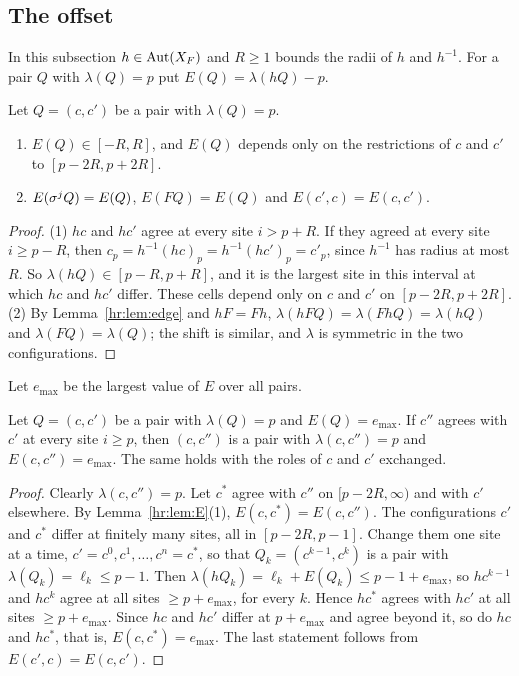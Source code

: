 \subsection{The offset}\label{hr:sec:offset}

In this subsection $h\in\operatorname{Aut}(X_F)$ and $R\ge1$ bounds the radii of $h$ and $h^{-1}$. For a pair $Q$ with $\lambda(Q)=p$ put $E(Q)=\lambda(hQ)-p$.

\begin{lemma}\label{hr:lem:E}
Let $Q=(c,c')$ be a pair with $\lambda(Q)=p$.
\begin{enumerate}
\item $E(Q)\in[-R,R]$, and $E(Q)$ depends only on the restrictions of $c$ and $c'$ to $[p-2R,p+2R]$.
\item $E(\sigma^jQ)=E(Q)$, $E(FQ)=E(Q)$ and $E(c',c)=E(c,c')$.
\end{enumerate}
\end{lemma}

\begin{proof}
(1) $hc$ and $hc'$ agree at every site $i>p+R$. If they agreed at every site $i\ge p-R$, then $c_p=h^{-1}(hc)_p=h^{-1}(hc')_p=c'_p$, since $h^{-1}$ has radius at most $R$. So $\lambda(hQ)\in[p-R,p+R]$, and it is the largest site in this interval at which $hc$ and $hc'$ differ. These cells depend only on $c$ and $c'$ on $[p-2R,p+2R]$. (2) By Lemma~\ref{hr:lem:edge} and $hF=Fh$, $\lambda(hFQ)=\lambda(FhQ)=\lambda(hQ)$ and $\lambda(FQ)=\lambda(Q)$; the shift is similar, and $\lambda$ is symmetric in the two configurations.
\end{proof}

Let $e_{\max}$ be the largest value of $E$ over all pairs.

\begin{lemma}\label{hr:lem:max}
Let $Q=(c,c')$ be a pair with $\lambda(Q)=p$ and $E(Q)=e_{\max}$. If $c''$ agrees with $c'$ at every site $i\ge p$, then $(c,c'')$ is a pair with $\lambda(c,c'')=p$ and $E(c,c'')=e_{\max}$. The same holds with the roles of $c$ and $c'$ exchanged.
\end{lemma}

\begin{proof}
Clearly $\lambda(c,c'')=p$. Let $c^*$ agree with $c''$ on $[p-2R,\infty)$ and with $c'$ elsewhere. By Lemma~\ref{hr:lem:E}(1), $E(c,c^*)=E(c,c'')$. The configurations $c'$ and $c^*$ differ at finitely many sites, all in $[p-2R,p-1]$. Change them one site at a time, $c'=c^0,c^1,\dots,c^n=c^*$, so that $Q_k=(c^{k-1},c^k)$ is a pair with $\lambda(Q_k)=\ell_k\le p-1$. Then $\lambda(hQ_k)=\ell_k+E(Q_k)\le p-1+e_{\max}$, so $hc^{k-1}$ and $hc^k$ agree at all sites $\ge p+e_{\max}$, for every $k$. Hence $hc^*$ agrees with $hc'$ at all sites $\ge p+e_{\max}$. Since $hc$ and $hc'$ differ at $p+e_{\max}$ and agree beyond it, so do $hc$ and $hc^*$, that is, $E(c,c^*)=e_{\max}$. The last statement follows from $E(c',c)=E(c,c')$.
\end{proof}

